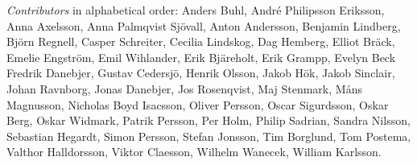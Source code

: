 \emph{Contributors} in alphabetical order:
Anders Buhl,
André Philipsson Eriksson,
Anna Axelsson,
Anna Palmqvist Sjövall,
Anton Andersson,
Benjamin Lindberg,
Björn Regnell,
Casper Schreiter,
Cecilia Lindskog,
Dag Hemberg,
Elliot Bräck,
Emelie Engström,
Emil Wihlander,
Erik Bjäreholt,
Erik Grampp,
Evelyn Beck
Fredrik Danebjer,
Gustav Cedersjö,
Henrik Olsson,
Jakob Hök,
Jakob Sinclair,
Johan Ravnborg,
Jonas Danebjer,
Jos Rosenqvist,
Maj Stenmark,
Måns Magnusson,
Nicholas Boyd Isacsson,
Oliver Persson,
Oscar Sigurdsson,
Oskar Berg,
Oskar Widmark,
Patrik Persson,
Per Holm,
Philip Sadrian,
Sandra Nilsson,
Sebastian Hegardt,
Simon Persson,
Stefan Jonsson,
Tim Borglund,
Tom Postema,
Valthor Halldorsson,
Viktor Claesson,
Wilhelm Wanecek,
William Karlsson.

